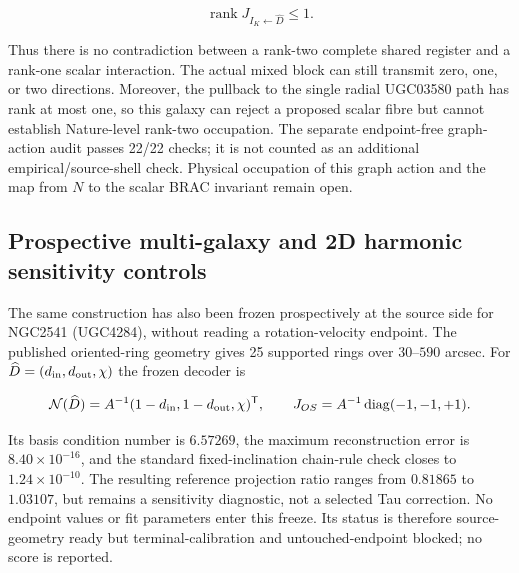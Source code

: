 \documentclass[11pt]{article}
\begin{document}
\[
\operatorname{rank}
J_{I_K\leftarrow\widehat D}\leq1.
\]

Thus there is no contradiction between a rank-two complete shared register
and a rank-one scalar interaction.  The actual mixed block can still transmit
zero, one, or two directions.  Moreover, the pullback to the single radial
UGC03580 path has rank at most one, so this galaxy can reject a proposed
scalar fibre but cannot establish Nature-level rank-two occupation.  The
separate endpoint-free graph-action audit passes 22/22 checks; it is not
counted as an additional empirical/source-shell check.  Physical occupation
of this graph action and the map from $N$ to the scalar BRAC invariant remain
open.

\subsection{Prospective multi-galaxy and 2D harmonic sensitivity controls}
\label{sec:prospective-multigalaxy-controls}

The same construction has also been frozen prospectively at the source side
for NGC2541 (UGC4284), without reading a rotation-velocity endpoint. The
published oriented-ring geometry gives 25 supported rings over
$30$--$590$ arcsec. For
$\widehat D=(d_{\rm in},d_{\rm out},\chi)$ the frozen decoder is

\[
 \mathcal{N}(\widehat D)
 =A^{-1}(1-d_{\rm in},1-d_{\rm out},\chi)^{\mathsf T},
 \qquad
 J_{OS}=A^{-1}\operatorname{diag}(-1,-1,+1).
\]

Its basis condition number is $6.57269$, the maximum reconstruction error is
$8.40\times10^{-16}$, and the standard fixed-inclination chain-rule check
closes to $1.24\times10^{-10}$. The resulting reference projection ratio
ranges from $0.81865$ to $1.03107$, but remains a sensitivity diagnostic, not
a selected Tau correction. No endpoint values or fit parameters enter this
freeze. Its status is therefore source-geometry ready but terminal-calibration
and untouched-endpoint blocked; no score is reported.
\end{document}

